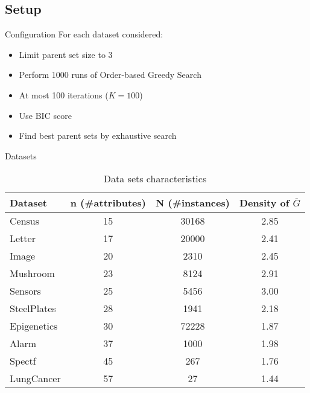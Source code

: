 \subsection{Setup}
	\begin{frame}{Configuration}
		For each dataset considered:
		\begin{itemize}
			\item Limit parent set size to 3
			\item Perform 1000 runs of Order-based Greedy Search
			\item At most 100 iterations ($K = 100$)
			\item Use BIC score
			\item Find best parent sets by exhaustive search
		\end{itemize}
	\end{frame}
	\begin{frame}{Datasets}
		\begin{table}
			\centering
			\begin{tabular}{ | l | c | c | c | }
				\hline
				Dataset & n (\#attributes) & N (\#instances) & Density of $\overline G$ \\ \hline
				Census & 15 & 30168 & 2.85 \\ \hline
				Letter & 17 & 20000 & 2.41 \\ \hline
				Image & 20 & 2310 & 2.45 \\ \hline
				Mushroom & 23 & 8124 & 2.91 \\ \hline
				Sensors & 25 & 5456 & 3.00 \\ \hline
				SteelPlates & 28 & 1941 & 2.18 \\ \hline
				Epigenetics & 30 & 72228 & 1.87 \\ \hline
				Alarm & 37 & 1000 & 1.98 \\ \hline
				Spectf & 45 & 267 & 1.76 \\ \hline
				LungCancer & 57 & 27 & 1.44 \\ \hline
			\end{tabular}
			\caption{Data sets characteristics}
			\label{tab:datasets}
		\end{table}
	\end{frame}